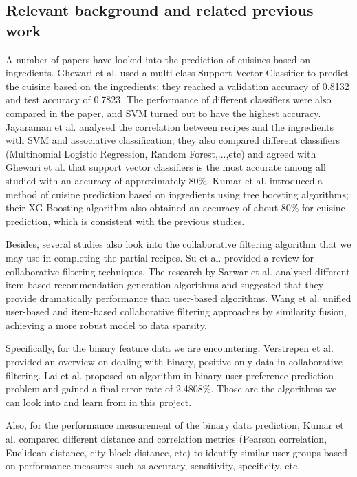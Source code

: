 \documentclass{article}
\begin{document}
\subsection{Relevant background and related previous work}
A number of papers have looked into the prediction of cuisines based on ingredients. Ghewari et al.
\cite{ghewari2015predicting} 
used a multi-class Support Vector Classifier to predict the cuisine based on the ingredients; they reached a validation accuracy of 0.8132 and test accuracy of 0.7823. The performance of different classifiers were also compared in the paper, and SVM turned out to have the highest accuracy. Jayaraman et al.
\cite{jayaraman2017analysis} 
analysed the correlation between recipes and the ingredients with SVM and associative classification; they also compared different classifiers (Multinomial Logistic Regression, Random Forest,...,etc) and agreed with Ghewari et al. that support vector classifiers is the most accurate among all studied with an accuracy of approximately 80\%. Kumar et al.
\cite{kumar2016cuisine}
introduced a method of cuisine prediction based on ingredients using tree boosting algorithms; their XG-Boosting algorithm also obtained an accuracy of about 80\% for cuisine prediction, which is consistent with the previous studies.

Besides, several studies also look into the collaborative filtering algorithm that we may use in completing the partial recipes. Su et al.
\cite{su2009survey}
provided a review for collaborative filtering techniques. The research by Sarwar et al.
\cite{sarwar2001item}
analysed different item-based recommendation generation algorithms and suggested that they provide dramatically performance than user-based algorithms. Wang et al.
\cite{wang2006unifying}
unified user-based and item-based collaborative filtering approaches by similarity fusion, achieving a more robust model to data sparsity.

Specifically, for the binary feature data we are encountering, Verstrepen et al.
\cite{cf_method1}
provided an overview on dealing with binary, positive-only data in collaborative filtering. Lai et al.
\cite{cf_method2}
proposed an algorithm in binary user preference prediction problem and gained a final error rate of 2.4808\%. Those are the algorithms we can look into and learn from in this project.

Also, for the performance measurement of the binary data prediction, Kumar et al.
\cite{metrics}
compared different distance and correlation metrics (Pearson correlation, Euclidean distance, city-block distance, etc) to identify similar user groups based on performance measures such as accuracy, sensitivity, specificity, etc. 
\end{document}
